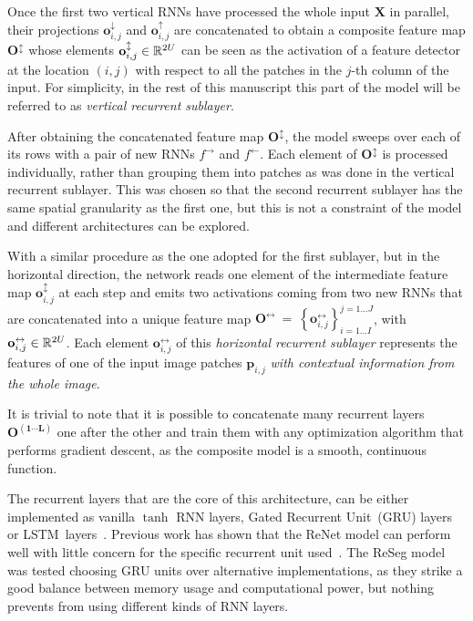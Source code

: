 Once the first two vertical RNNs have processed the whole input $\mathbf{X}$ in
parallel, their projections $\mathbf{o}^{\downarrow}_{i,j}$ and
$\mathbf{o}^{\uparrow}_{i,j}$ are concatenated to obtain a composite feature
map $\mathbf{O^{\updownarrow}}$ whose elements $\mathbf{o}^{\updownarrow}_{i,j}
\in \mathbb{R}^{2U}$ can be seen as the activation of a feature detector at the
location $(i,j)$ with respect to all the patches in the $j$-th column of the
input. For simplicity, in the rest of this manuscript this part of the model
will be referred to as \emph{vertical recurrent sublayer}.

After obtaining the concatenated feature map $\mathbf{O^{\updownarrow}}$, the
model sweeps over each of its rows with a pair of new RNNs $f^{\rightarrow}$
and $f^{\leftarrow}$. Each element of $\mathbf{O^{\updownarrow}}$ is processed
individually, rather than grouping them into patches as was done in the
vertical recurrent sublayer. This was chosen so that the second recurrent
sublayer has the same spatial granularity as the first one, but this is not a
constraint of the model and different architectures can be explored.

With a similar procedure as the one adopted for the first sublayer, but in the
horizontal direction, the network reads one element of the intermediate feature
map $\mathbf{o}^\updownarrow_{i,j}$ at each step and emits two activations
coming from two new RNNs that are concatenated into a unique feature map
$\mathbf{O^\leftrightarrow}~=~\left\{ \mathbf{o}^\leftrightarrow_{i,j} \right\}
_{i=1\dots I}^{j=1\dots J}$, with $\mathbf{o}^\leftrightarrow_{i,j} \in
\mathbb{R}^{2U}$. Each element $\mathbf{o}^\leftrightarrow_{i,j}$ of this
\emph{horizontal recurrent sublayer} represents the features of one of the
input image patches $\mathbf{p}_{i,j}$ \emph{with contextual information from
the whole image}.

It is trivial to note that it is possible to concatenate many recurrent layers
$\mathbf{O^{(1 \cdots L)}}$ one after the other and train them with any
optimization algorithm that performs gradient descent, as the composite model
is a smooth, continuous function.

The recurrent layers that are the core of this architecture, can be either
implemented as vanilla $\tanh$ RNN layers, Gated Recurrent Unit~(GRU)
layers~\citep{Cho2014} or LSTM~layers~\citep{Hochreiter+Schmidhuber-1997}.
Previous work has shown that the ReNet model can perform well with little
concern for the specific recurrent unit used~\citep{visin2015renet}. The ReSeg
model was tested choosing GRU units over alternative implementations, as
they strike a good balance between memory usage and computational power, but
nothing prevents from using different kinds of RNN layers.

